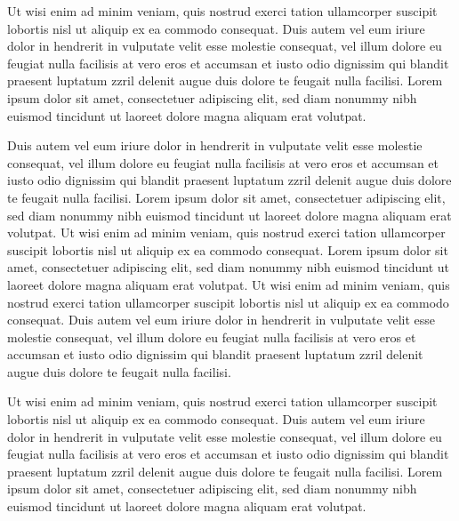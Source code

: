 \documentclass[oldfontcommands,6x9]{pupbook}
\begin{document}
\begin{thepreface}
Ut wisi enim ad minim veniam, quis nostrud exerci tation ullamcorper
suscipit lobortis nisl ut aliquip ex ea commodo consequat. Duis autem
vel eum iriure dolor in hendrerit in vulputate velit esse molestie
consequat, vel illum dolore eu feugiat nulla facilisis at vero eros et
accumsan et iusto odio dignissim qui blandit praesent luptatum zzril
delenit augue duis dolore te feugait nulla facilisi. Lorem ipsum dolor
sit amet, consectetuer adipiscing elit, sed diam nonummy nibh euismod
tincidunt ut laoreet dolore magna aliquam erat volutpat. 

Duis autem vel eum iriure dolor in hendrerit in vulputate velit esse
molestie consequat, vel illum dolore eu feugiat nulla facilisis at vero
eros et accumsan et iusto odio dignissim qui blandit praesent luptatum
zzril delenit augue duis dolore te feugait nulla facilisi. Lorem ipsum
dolor sit amet, consectetuer adipiscing elit, sed diam nonummy nibh
euismod tincidunt ut laoreet dolore magna aliquam erat volutpat. Ut wisi
enim ad minim veniam, quis nostrud exerci tation ullamcorper suscipit
lobortis nisl ut aliquip ex ea commodo consequat. 
Lorem ipsum dolor sit amet, consectetuer adipiscing elit, sed diam
nonummy nibh euismod tincidunt ut laoreet dolore magna aliquam erat
volutpat. Ut wisi enim ad minim veniam, quis nostrud exerci tation
ullamcorper suscipit lobortis nisl ut aliquip ex ea commodo consequat.
Duis autem vel eum iriure dolor in hendrerit in vulputate velit esse
molestie consequat, vel illum dolore eu feugiat nulla facilisis at vero
eros et accumsan et iusto odio dignissim qui blandit praesent luptatum
zzril delenit augue duis dolore te feugait nulla facilisi. 

Ut wisi enim ad minim veniam, quis nostrud exerci tation ullamcorper
suscipit lobortis nisl ut aliquip ex ea commodo consequat. Duis autem
vel eum iriure dolor in hendrerit in vulputate velit esse molestie
consequat, vel illum dolore eu feugiat nulla facilisis at vero eros et
accumsan et iusto odio dignissim qui blandit praesent luptatum zzril
delenit augue duis dolore te feugait nulla facilisi. Lorem ipsum dolor
sit amet, consectetuer adipiscing elit, sed diam nonummy nibh euismod
tincidunt ut laoreet dolore magna aliquam erat volutpat. 


\end{thepreface}
\end{document}
